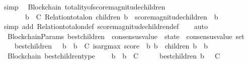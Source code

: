 \begin{isabellebody}
\ simp%
\endisatagproof
{\isafoldproof}%
%
\isadelimproof
\isanewline
%
\endisadelimproof
\isanewline
{}\isamarkupfalse%
\ {\isacharparenleft}\ Blockchain{\isacharparenright}\ totality{\isacharunderscore}of{\isacharunderscore}score{\isacharunderscore}magnitude{\isacharunderscore}children\ {\isacharcolon}\isanewline
\ \ {\isachardoublequoteopen}{\isasymforall}\ {\isasymsigma}\ {\isasymin}\ {\isasymSigma}{\isachardot}\ {\isasymforall}\ b\ {\isasymin}\ C{\isachardot}\ Relation{\isachardot}total{\isacharunderscore}on\ {\isacharparenleft}children\ {\isacharparenleft}b{\isacharcomma}\ {\isasymsigma}{\isacharparenright}{\isacharparenright}\ {\isacharparenleft}score{\isacharunderscore}magnitude{\isacharunderscore}children\ {\isasymsigma}\ b{\isacharparenright}{\isachardoublequoteclose}\isanewline
%
\isadelimproof
\ \ %
\endisadelimproof
%
\isatagproof
{}\isamarkupfalse%
\ {\isacharparenleft}simp\ add{\isacharcolon}\ Relation{\isachardot}total{\isacharunderscore}on{\isacharunderscore}def\ score{\isacharunderscore}magnitude{\isacharunderscore}children{\isacharunderscore}def{\isacharparenright}\isanewline
\ \ \isamarkupfalse%
\ auto%
\endisatagproof
{\isafoldproof}%
%
\isadelimproof
\isanewline
%
\endisadelimproof
\isanewline
\isanewline
{}\isamarkupfalse%
\ {\isacharparenleft}\ BlockchainParams{\isacharparenright}\ best{\isacharunderscore}children\ {\isacharcolon}{\isacharcolon}\ {\isachardoublequoteopen}consensus{\isacharunderscore}value\ {\isacharasterisk}\ state\ {\isasymRightarrow}\ consensus{\isacharunderscore}value\ set{\isachardoublequoteclose}\isanewline
\ \ \isanewline
\ \ \ \ {\isachardoublequoteopen}best{\isacharunderscore}children\ {\isacharequal}\ {\isacharparenleft}{\isasymlambda}\ {\isacharparenleft}b{\isacharcomma}\ {\isasymsigma}{\isacharparenright}{\isachardot}\ {\isacharbraceleft}b{\isacharprime}\ {\isasymin}\ C{\isachardot}\ is{\isacharunderscore}arg{\isacharunderscore}max\ {\isacharparenleft}score\ {\isasymsigma}{\isacharparenright}\ {\isacharparenleft}{\isasymlambda}b{\isacharprime}{\isachardot}\ b{\isacharprime}\ {\isasymin}\ children\ {\isacharparenleft}b{\isacharcomma}\ {\isasymsigma}{\isacharparenright}{\isacharparenright}\ b{\isacharprime}{\isacharbraceright}{\isacharparenright}{\isachardoublequoteclose}\isanewline
\isanewline
{}\isamarkupfalse%
\ {\isacharparenleft}\ Blockchain{\isacharparenright}\ best{\isacharunderscore}children{\isacharunderscore}type\ {\isacharcolon}\isanewline
\ \ {\isachardoublequoteopen}{\isasymforall}\ b\ {\isasymsigma}{\isachardot}\ b\ {\isasymin}\ C\ {\isasymand}\ {\isasymsigma}\ {\isasymin}\ {\isasymSigma}\ {\isasymlongrightarrow}\ best{\isacharunderscore}children\ {\isacharparenleft}b{\isacharcomma}\ {\isasymsigma}{\isacharparenright}\ {\isasymsubseteq}\ C{\isachardoublequoteclose}\isanewline

\end{isabellebody}
